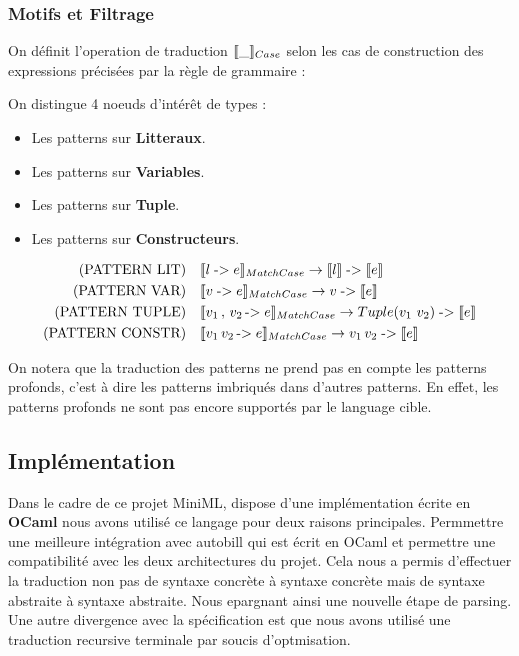 \documentclass[12pt]{article}
\begin{document}
\subsubsection*{Motifs et Filtrage}\label{motifs-et-filtrage}

On définit l'operation de traduction \(\llbracket \_ \rrbracket_{Case}\) selon les cas de construction
des expressions précisées par la règle de grammaire : 

On distingue 4 noeuds d'intérêt de types :
\begin{itemize}
      \tightlist
      \item
            Les patterns sur \textbf{Litteraux}.
      \item
            Les patterns sur \textbf{Variables}.
      \item
            Les patterns sur \textbf{Tuple}.
      \item
            Les patterns sur \textbf{Constructeurs}.
\end{itemize}

\begin{align*}
      \text{(PATTERN LIT)} \quad    & \llbracket l \; \text{->} \; e \rrbracket_{MatchCase} \rightarrow \llbracket l \rrbracket \; \text{->} \; \llbracket e \rrbracket                \\
      \text{(PATTERN VAR)} \quad    & \llbracket v \; \text{->} \; e \rrbracket_{MatchCase} \rightarrow v \; \text{->} \; \llbracket e \rrbracket                                  \\
      \text{(PATTERN TUPLE)} \quad  & \llbracket v_1 \, , \, v_2 \, \text{->} \; e \rrbracket_{MatchCase} \rightarrow Tuple(v_1 \, \, v_2) \; \text{->} \; \llbracket e \rrbracket \\
      \text{(PATTERN CONSTR)} \quad & \llbracket v_1 \, v_2 \, \text{->} \; e \rrbracket_{MatchCase} \rightarrow v_1 \, v_2 \; \text{->} \; \llbracket e \rrbracket                \\
\end{align*}

On notera que la traduction des patterns ne prend pas en compte les patterns profonds, c'est à dire les patterns imbriqués dans d'autres patterns.
En effet, les patterns profonds ne sont pas encore supportés par le language cible.


\hypertarget{Implémentation}{%
      \subsection{Implémentation}\label{Implementation}}
Dans le cadre de ce projet MiniML, dispose d'une implémentation écrite en \textbf{OCaml} nous avons utilisé ce langage pour deux raisons principales.
Permmettre une meilleure intégration avec autobill qui est écrit en OCaml et permettre une compatibilité avec les deux architectures du projet.
Cela nous a permis d'effectuer la traduction non pas de syntaxe concrète à syntaxe concrète mais de syntaxe abstraite à syntaxe abstraite.
Nous epargnant ainsi une nouvelle étape de parsing.
Une autre divergence avec la spécification est que nous avons utilisé une traduction recursive terminale par soucis d'optmisation.
\end{document}

